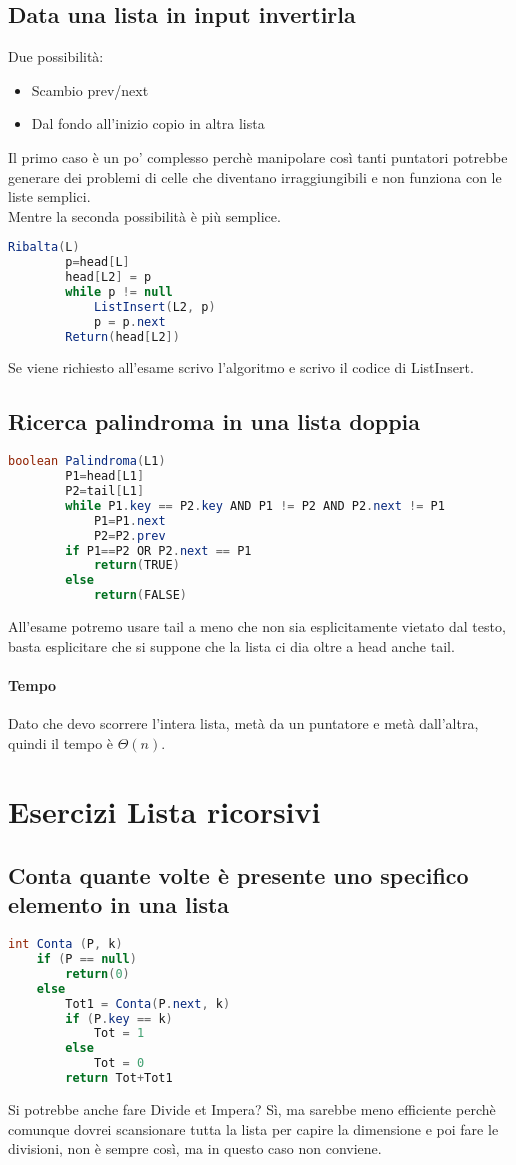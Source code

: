 \subsection{Data una lista in input invertirla}
Due possibilità:
\begin{itemize}
    \item Scambio prev/next
    \item Dal fondo all'inizio copio in altra lista
\end{itemize} 
Il primo caso è un po' complesso perchè manipolare così tanti puntatori
potrebbe generare dei problemi di celle che diventano irraggiungibili e
non funziona con le liste semplici.\\
Mentre la seconda possibilità è più semplice.
\begin{lstlisting}[language=Java]
    Ribalta(L)
        p=head[L]
        head[L2] = p
        while p != null
            ListInsert(L2, p)
            p = p.next
        Return(head[L2])
\end{lstlisting}
Se viene richiesto all'esame scrivo l'algoritmo e scrivo
il codice di ListInsert.\\
\subsection{Ricerca palindroma in una lista doppia}
\begin{lstlisting}[language=Java]
    boolean Palindroma(L1)
        P1=head[L1]
        P2=tail[L1]
        while P1.key == P2.key AND P1 != P2 AND P2.next != P1
            P1=P1.next
            P2=P2.prev
        if P1==P2 OR P2.next == P1
            return(TRUE)
        else
            return(FALSE)
\end{lstlisting}
All'esame potremo usare tail a meno che non sia esplicitamente
vietato dal testo, basta esplicitare che si suppone che la lista ci dia
oltre a head anche tail.
\paragraph*{Tempo}Dato che devo scorrere l'intera lista, metà da un puntatore
e metà dall'altra, quindi il tempo è $\Theta(n)$.
\section{Esercizi Lista ricorsivi}
\subsection{Conta quante volte è presente uno specifico elemento in una lista}
\begin{lstlisting}[language=Java]
    int Conta (P, k)
    if (P == null)
        return(0)
    else
        Tot1 = Conta(P.next, k)
        if (P.key == k)
            Tot = 1
        else
            Tot = 0
        return Tot+Tot1
\end{lstlisting}
Si potrebbe anche fare Divide et Impera? Sì, ma sarebbe meno efficiente perchè
comunque dovrei scansionare tutta la lista per capire la dimensione e poi fare
le divisioni, non è sempre così, ma in questo caso non conviene.
